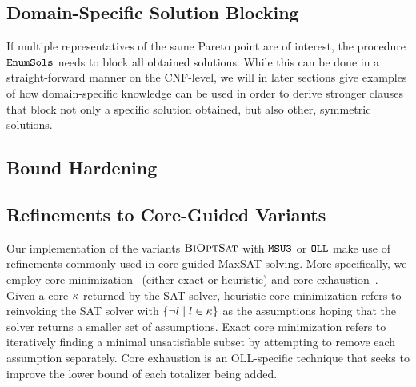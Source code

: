 \subsection{Domain-Specific Solution Blocking}

If multiple representatives of the same Pareto point are of interest, the procedure $\texttt{EnumSols}$ needs to block all obtained solutions. 
While this can be done in a straight-forward manner on the CNF-level, we will in later sections give examples of how domain-specific knowledge can be used in order to derive stronger clauses that block not only a specific solution obtained, but also other, symmetric solutions.

\subsection{Bound Hardening}


\subsection{Refinements to Core-Guided Variants}

Our implementation of the variants $\textsc{BiOptSat}$ with $\texttt{MSU3}$ or $\texttt{OLL}$ make use of refinements commonly used in core-guided MaxSAT solving.
More specifically, we employ core minimization~\autocite{DBLP:journals/jsat/IgnatievMM19} (either exact or heuristic) and core-exhaustion~\autocites{DBLP:journals/jsat/IgnatievMM19,DBLP:conf/cp/AnsoteguiBGL13}.
Given a core $\kappa$ returned by the SAT solver, heuristic core minimization refers to reinvoking the SAT solver with $\{\lnot l \mid l \in \kappa\}$ as the assumptions hoping that the solver returns a smaller set of assumptions.
Exact core minimization refers to iteratively finding a minimal unsatisfiable subset by attempting to remove each assumption separately.
Core exhaustion is an OLL-specific technique that seeks to improve the lower bound of each totalizer being added.
